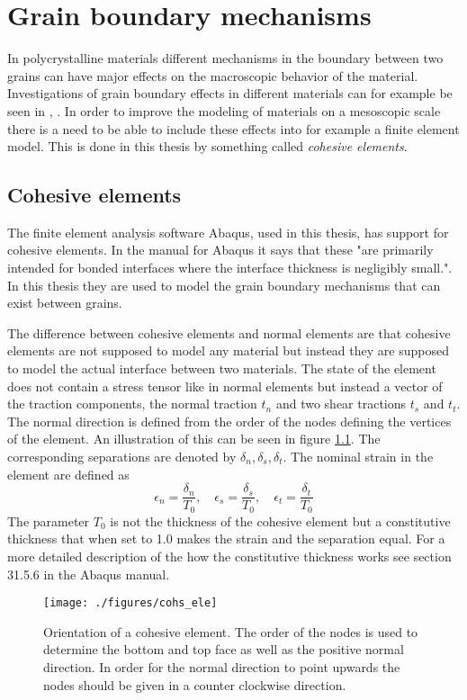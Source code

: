 \documentclass[grain_boundary_law.tex]{subfiles}
\begin{document}
\chapter{Grain boundary mechanisms}


In polycrystalline materials different mechanisms in the boundary between two grains can have major effects on the macroscopic behavior of the material. Investigations of grain boundary effects in different materials can for example be seen in \cite{eff_grain}, \cite{grain_poly}. In order to improve the modeling of materials on a mesoscopic scale there is a need to be able to include these effects into for example a finite element model. This is done in this thesis by something called \textit{cohesive elements}.

\section{Cohesive elements}

The finite element analysis software Abaqus, used in this thesis, has support for cohesive elements. In the manual for Abaqus it says that these "are primarily intended for bonded interfaces where the interface thickness is negligibly small.". In this thesis they are used to model the grain boundary mechanisms that can exist between grains.

The difference between cohesive elements and normal elements are that cohesive elements are not supposed to model any material but instead they are supposed to model the actual interface between two materials. The state of the element does not contain a stress tensor like in normal elements but instead a vector of the traction components, the normal traction $t_n$ and two shear tractions $t_s$ and $t_t$. The normal direction is defined from the order of the nodes defining the vertices of the element. An illustration of this can be seen in figure \ref{fig:cohs_ori}. The corresponding separations are denoted by $\delta_n, \delta_s, \delta_t$. The nominal strain in the element are defined as
%
\[ \epsilon_n = \frac{\delta_n}{T_0}, \quad \epsilon_s = \frac{\delta_s}{T_0}, \quad \epsilon_t = \frac{\delta_t}{T_0}  \]
%
The parameter $T_0$ is not the thickness of the cohesive element but a constitutive thickness that when set to 1.0 makes the strain and the separation equal. For a more detailed description of the how the constitutive thickness works see section 31.5.6 in the Abaqus manual.



\begin{figure}
\centering
 \texttt{[image: ./figures/cohs\_ele]}
\caption{Orientation of a cohesive element. The order of the nodes is used to determine the bottom and top face as well as the positive normal direction. In order for the normal direction to point upwards the nodes should be given in a counter clockwise direction.}
\label{fig:cohs_ori}
\end{figure}
\end{document}
